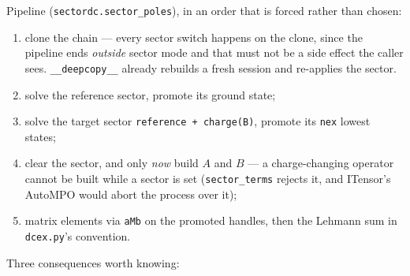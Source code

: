 \documentclass[11pt]{article}
\begin{document}
Pipeline (\texttt{sectordc.sector\_poles}), in an order that is forced
rather than chosen:

\begin{enumerate}
\item clone the chain --- every sector switch happens on the clone, since
  the pipeline ends \emph{outside} sector mode and that must not be a
  side effect the caller sees. \texttt{\_\_deepcopy\_\_} already rebuilds
  a fresh session and re-applies the sector.
\item solve the reference sector, promote its ground state;
\item solve the target sector \texttt{reference + charge(B)}, promote its
  \texttt{nex} lowest states;
\item clear the sector, and only \emph{now} build $A$ and $B$ --- a
  charge-changing operator cannot be built while a sector is set
  (\texttt{sector\_terms} rejects it, and ITensor's AutoMPO would abort
  the process over it);
\item matrix elements via \texttt{aMb} on the promoted handles, then the
  Lehmann sum in \texttt{dcex.py}'s convention.
\end{enumerate}

Three consequences worth knowing:
\end{document}
